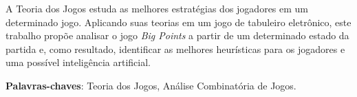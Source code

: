 \begin{resumo}

A Teoria dos Jogos estuda as melhores estratégias dos jogadores em um
determinado jogo. Aplicando suas teorias em um jogo de tabuleiro
eletrônico, este trabalho propõe analisar o jogo \emph{Big Points} a
partir de um determinado estado da partida e, como resultado,
identificar as melhores heurísticas para os jogadores e uma possível
inteligência artificial.

 \vspace{\onelineskip}

 \noindent
 \textbf{Palavras-chaves}: Teoria dos Jogos, Análise Combinatória de Jogos.
\end{resumo}

